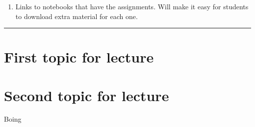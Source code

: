 \documentclass[]{book}
\providecommand{\tightlist}{%
  \setlength{\itemsep}{0pt}\setlength{\parskip}{0pt}}
\begin{document}
\begin{enumerate}
\def\labelenumi{\arabic{enumi}.}
\tightlist
\item
  Links to notebooks that have the assignments. Will make it
  easy for students to download extra material for each one.
\end{enumerate}

\begin{center}\rule{0.5\linewidth}{\linethickness}\end{center}

\hypertarget{first-topic-for-lecture-5}{%
\section{First topic for lecture}\label{first-topic-for-lecture-5}}

\hypertarget{second-topic-for-lecture-5}{%
\section{Second topic for lecture}\label{second-topic-for-lecture-5}}

Boing


\end{document}
